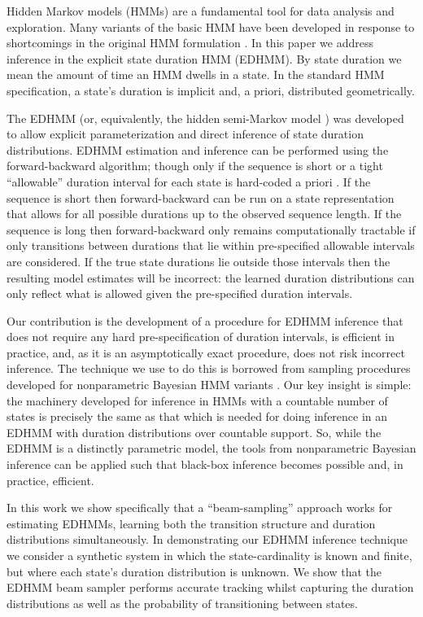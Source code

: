 \label{section}
Hidden Markov models (HMMs) are a fundamental tool for data analysis and exploration.  Many variants of the basic HMM have been developed in response to shortcomings in the original HMM formulation \cite{Rabiner89}.  In this paper we address inference in the explicit state duration HMM (EDHMM).  By state duration we mean the amount of time an HMM dwells in a state.  In the standard HMM specification, a state's duration is implicit and, a priori, distributed geometrically.

The EDHMM  (or, equivalently, the hidden semi-Markov model \cite{Yu10}) was developed to 
allow explicit parameterization and direct inference of state duration 
distributions.   EDHMM estimation and inference can be performed using the 
forward-backward algorithm; though only if the sequence is short or a tight 
``allowable'' duration interval for each state is hard-coded a priori 
\cite{Yu2006}.   If the sequence is short then forward-backward can be run 
on a state representation that allows for all possible durations up to the 
observed sequence length.  If the sequence is long then forward-backward 
only remains computationally tractable if only transitions between durations 
that lie within pre-specified allowable intervals are considered.   If the 
true state durations lie outside those intervals then the resulting model 
estimates will be incorrect: the learned duration distributions can only reflect 
 what is allowed given the pre-specified duration intervals. %

Our contribution is the development of a procedure for EDHMM inference that does not require any hard pre-specification of duration intervals, is efficient in practice, and, as it is an asymptotically exact procedure, does not risk incorrect inference.  The technique we use to do this 
is borrowed from sampling procedures developed for nonparametric  Bayesian HMM variants \cite{vanGael2008}.  Our key insight is simple: the machinery developed for inference in HMMs with a countable number of states is precisely the same as that which is needed for doing inference in an EDHMM with duration distributions over countable support.  So, while the EDHMM is a distinctly parametric model, the tools from nonparametric Bayesian inference can be applied such that black-box inference becomes possible and, in practice, efficient.

In this work we show specifically that a ``beam-sampling'' approach  \cite{vanGael2008} works for  estimating EDHMMs, learning both the transition structure and duration distributions simultaneously.  In demonstrating our EDHMM inference technique we consider a synthetic system  in which the state-cardinality is known and finite, but where each state's duration distribution is unknown. We show that the EDHMM beam sampler performs accurate tracking whilst capturing the duration distributions as well as the probability of transitioning between states.

